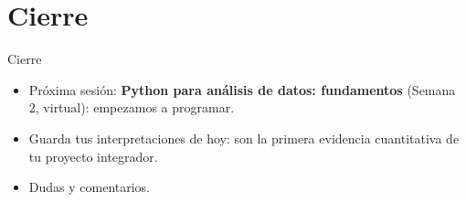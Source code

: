 \documentclass[aspectratio=169,11pt]{beamer}
\begin{document}
\section{Cierre}
\begin{frame}{Cierre}
  \begin{itemize}
    \item Próxima sesión: \textbf{Python para análisis de datos:
      fundamentos} (Semana 2, virtual): empezamos a programar.
    \item Guarda tus interpretaciones de hoy: son la primera evidencia
      cuantitativa de tu proyecto integrador.
    \item Dudas y comentarios.
  \end{itemize}
\end{frame}

{
\begin{frame}[plain]
\end{frame}
}
\end{document}
